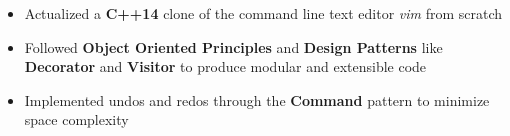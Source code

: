 \documentclass[10pt,a4paper,ragged2e]{altacv}
\begin{document}
\divider
\fi
{}
\begin{itemize}
    \item Actualized a \textbf{C++14} clone of the command line text editor \emph{vim} from scratch
    \item Followed \textbf{Object Oriented Principles} and \textbf{Design Patterns} like \textbf{Decorator} and \textbf{Visitor} to produce modular and extensible code
    \item Implemented undos and redos through the \textbf{Command} pattern to minimize space complexity
\end{itemize}
\end{document}
